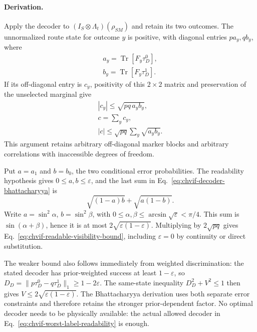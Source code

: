 \paragraph{Derivation.}
Apply the decoder to $(I_S\otimes\Lambda_t)(\rho_{SM})$ and retain its
two outcomes. The unnormalized route state for outcome $y$ is positive,
with diagonal entries $p a_y,q b_y$, where
\begin{equation}
\begin{gathered}
a_y=\operatorname{Tr}[F_y\tau_D^0],\\
 b_y=\operatorname{Tr}[F_y\tau_D^1].
\end{gathered}
\end{equation}
If its off-diagonal entry is $c_y$, positivity of this $2\times2$ matrix
and preservation of the unselected marginal give
\begin{equation}
\begin{gathered}
|c_y|\leq\sqrt{pq\,a_yb_y},\\
 c=\sum_y c_y,
 \\
 |c|\leq\sqrt{pq}\sum_y\sqrt{a_yb_y}.
\end{gathered}
\label{eq:chvif-decoder-bhattacharyya}
\end{equation}
This argument retains arbitrary off-diagonal marker blocks and arbitrary
correlations with inaccessible degrees of freedom.

Put $a=a_1$ and $b=b_0$, the two conditional error probabilities. The
readability hypothesis gives $0\leq a,b\leq\varepsilon$, and the last
sum in Eq.~\eqref{eq:chvif-decoder-bhattacharyya} is
\begin{equation}
 \sqrt{(1-a)b}+\sqrt{a(1-b)}.
\end{equation}
Write $a=\sin^2\alpha$, $b=\sin^2\beta$, with
$0\leq\alpha,\beta\leq\arcsin\sqrt{\varepsilon}<\pi/4$. This sum is
$\sin(\alpha+\beta)$, hence it is at most
$2\sqrt{\varepsilon(1-\varepsilon)}$. Multiplying by $2\sqrt{pq}$ gives
Eq.~\eqref{eq:chvif-readable-visibility-bound}, including
$\varepsilon=0$ by continuity or direct substitution.

The weaker bound also follows immediately from weighted discrimination:
the stated decoder has prior-weighted success at least $1-\varepsilon$,
so $D_D=\|p\tau_D^0-q\tau_D^1\|_1\geq1-2\varepsilon$.
The same-state inequality $D_D^2+V^2\leq1$ then gives
$V\leq2\sqrt{\varepsilon(1-\varepsilon)}$. The
Bhattacharyya derivation uses both separate error constraints and therefore
retains the stronger prior-dependent factor. No optimal decoder needs to
be physically available: the actual allowed decoder in
Eq.~\eqref{eq:chvif-worst-label-readability} is enough.

